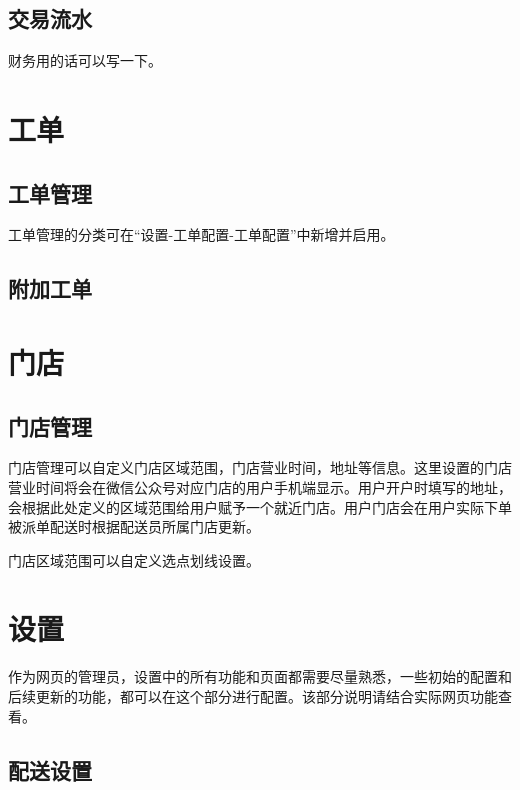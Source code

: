\documentclass[UTF8]{ctexart}
\begin{document}
\subsection{交易流水}

财务用的话可以写一下。


\section{工单}

\subsection{工单管理}

工单管理的分类可在“设置-工单配置-工单配置”中新增并启用。

\subsection{附加工单}




\section{门店}

\subsection{门店管理}

门店管理可以自定义门店区域范围，门店营业时间，地址等信息。这里设置的门店营业时间将会在微信公众号对应门店的用户手机端显示。用户开户时填写的地址，会根据此处定义的区域范围给用户赋予一个就近门店。用户门店会在用户实际下单被派单配送时根据配送员所属门店更新。


门店区域范围可以自定义选点划线设置。



\section{设置}
作为网页的管理员，设置中的所有功能和页面都需要尽量熟悉，一些初始的配置和后续更新的功能，都可以在这个部分进行配置。该部分说明请结合实际网页功能查看。

\subsection{配送设置}
\end{document}

